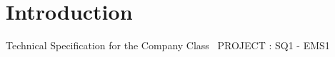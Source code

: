 \hypertarget{index_intro_sec}{}\section{Introduction}\label{index_intro_sec}
Technical Specification for the Company Class~\newline
 P\+R\+O\+J\+E\+C\+T \+: S\+Q1 -\/ E\+M\+S1~\newline
 